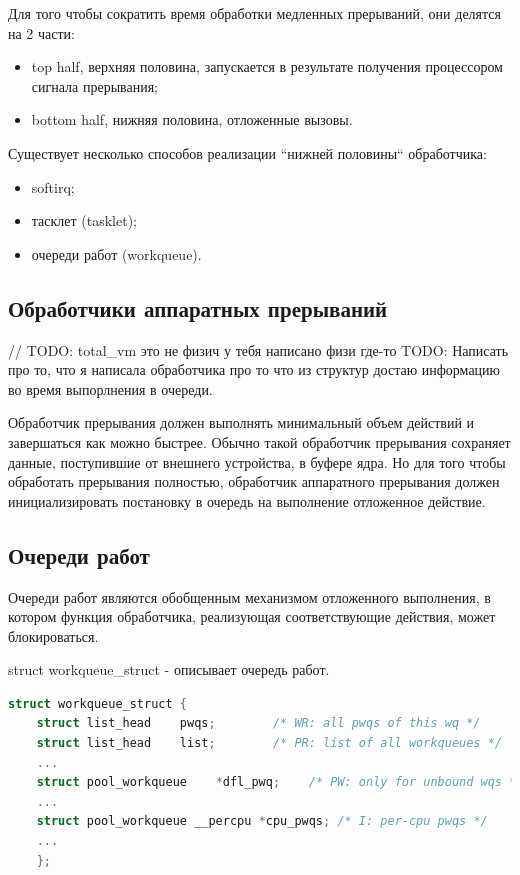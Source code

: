 Для того чтобы сократить время обработки медленных прерываний, они делятся на 2 части:

\begin{itemize}
	\item top half, верхняя половина, запускается в результате получения процессором сигнала прерывания;
	\item bottom half, нижняя половина, отложенные вызовы.
\end{itemize}

Существует несколько способов реализации “нижней половины“
обработчика: 
\begin{itemize}
	\item softirq;
	\item тасклет (tasklet);
	\item очереди работ (workqueue).
\end{itemize}
\subsection{Обработчики аппаратных прерываний}


// TODO: total\_vm  это не физич у тебя написано физи где-то
TODO:  Написать про то, что я написала обработчика  про то что из структур достаю информацию во время
выпорлнения в очереди. 

Обработчик прерывания должен выполнять минимальный объем действий и завершаться как можно быстрее.
Обычно такой обработчик прерывания сохраняет данные, поступившие от внешнего устройства, в буфере ядра. 
Но для того чтобы обработать прерывания полностью, обработчик аппаратного прерывания должен 
инициализировать постановку в очередь на выполнение отложенное действие.

\subsection{Очереди работ}

Очереди работ являются обобщенным механизмом отложенного выполнения, в котором 
функция обработчика, реализующая соответствующие действия, может блокироваться.

struct workqueue\_struct - описывает очередь работ.

\begin{lstlisting}[language=c, label=some-code, caption=Структура workqueue\_struct]
struct workqueue_struct {
	struct list_head    pwqs;        /* WR: all pwqs of this wq */
	struct list_head    list;        /* PR: list of all workqueues */
	...
	struct pool_workqueue    *dfl_pwq;    /* PW: only for unbound wqs */
	...
	struct pool_workqueue __percpu *cpu_pwqs; /* I: per-cpu pwqs */
	...
	};
\end{lstlisting}

